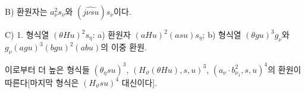 
B) 환원자는 $a_\nu^2s_\nu$와 $(\widehat{j\nu su})s_\nu$이다.

C) 1. 형식열 $(\theta Hu)^2s_\eta$: a) 환원자 $(aHu)^2(asu)s_\eta$; b) 형식열 $(\theta gu)^3g_\nu$와 $g_\nu(agu)^3(bgu)^2(abu)$의 이중 환원.

이로부터 더 높은 형식들 $(\theta_\eta su)^3$, $(H_\vartheta(\theta Hu),s,u)^3$, $(a_\nu\cdot b_{\nu_1}^2,s,u)^4$의 환원이 따른다[마지막 형식은 $(H_\vartheta su)^4$ 대신이다].

